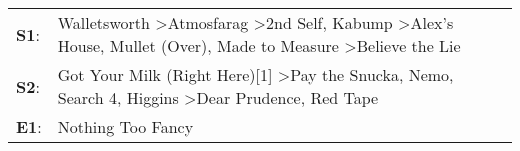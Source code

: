 \begin{supertabular}{p{0.03\textwidth}p{0.92\textwidth}}
 \textbf{S1}:  &  Walletsworth\textsuperscript{} \textgreater \enspace Atmosfarag\textsuperscript{} \textgreater \enspace 2nd Self\textsuperscript{}, \enspace Kabump\textsuperscript{} \textgreater \enspace Alex's House\textsuperscript{}, \enspace Mullet (Over)\textsuperscript{}, \enspace Made to Measure\textsuperscript{} \textgreater \enspace Believe the Lie\textsuperscript{}  \enspace  \\
 \textbf{S2}:  &                                                               Got Your Milk (Right Here)[1]\textsuperscript{} \textgreater \enspace Pay the Snucka\textsuperscript{}, \enspace Nemo\textsuperscript{}, \enspace Search 4\textsuperscript{}, \enspace Higgins\textsuperscript{} \textgreater \enspace Dear Prudence\textsuperscript{}, \enspace Red Tape\textsuperscript{}  \enspace  \\
 \textbf{E1}:  &                                                                                                                                                                                                                                                                                                                                       Nothing Too Fancy\textsuperscript{}  \enspace  \\
\end{supertabular}
